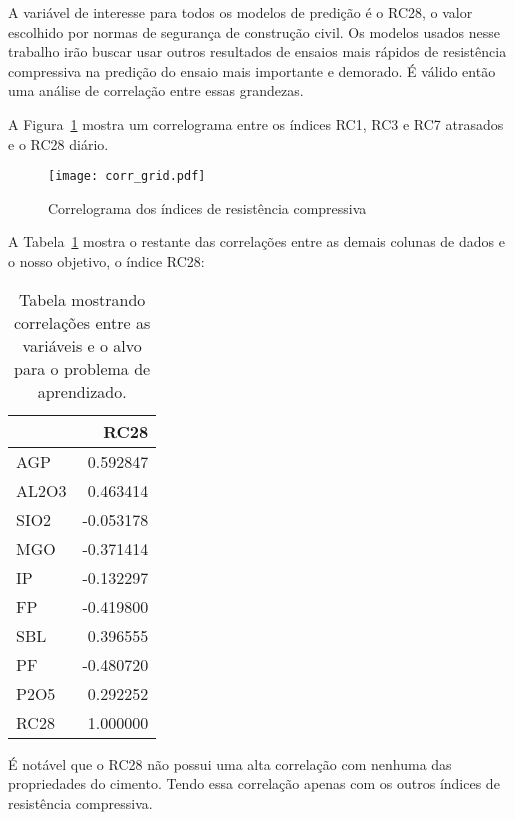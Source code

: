 A variável de interesse para todos os modelos de predição é o RC28, o valor
escolhido por normas de segurança de construção civil. Os modelos usados nesse
trabalho irão buscar usar outros resultados de ensaios mais rápidos de
resistência compressiva na predição do ensaio mais importante e demorado. É
válido então uma análise de correlação entre essas grandezas.


A Figura~\ref{fig:gridcorr} mostra um correlograma entre os índices RC1, RC3 e RC7
atrasados e o RC28 diário. 

\begin{figure}[H]
  \centering
  \texttt{[image: corr\_grid.pdf]}
  \caption{Correlograma dos índices de resistência compressiva}
  \label{fig:gridcorr}
\end{figure}

A Tabela~\ref{tabelacorr} mostra o restante das correlações entre as demais
colunas de dados e o nosso objetivo, o índice RC28:


\begin{table}[H]
  \centering
\begin{tabular}{lr}
  \toprule
  {} &      RC28 \\
  \midrule
  AGP   &  0.592847 \\
  AL2O3 &  0.463414 \\
  SIO2  & -0.053178 \\
  MGO   & -0.371414 \\
  IP    & -0.132297 \\
  FP    & -0.419800 \\
  SBL   &  0.396555 \\
  PF    & -0.480720 \\
  P2O5  &  0.292252 \\
  RC28  &  1.000000 \\
  \bottomrule
\end{tabular}
\caption{Tabela mostrando correlações entre as variáveis e o alvo para o problema de aprendizado.}
\label{tabelacorr}
\end{table}


É notável que o RC28 não possui uma alta correlação com nenhuma das propriedades
do cimento. Tendo essa correlação apenas com os outros índices de resistência compressiva.




